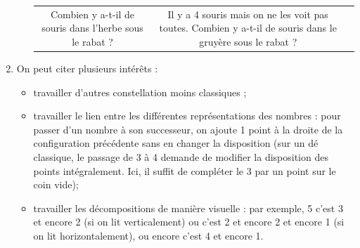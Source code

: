 \begin{corrige}
\begin{enumerate}
\begin{itemize}
\begin{tabular}{C{5}C{5}C{5}}
         Combien y a-t-il de souris dans l'herbe sous le rabat ? 
         &
         Il y a 4 souris mais on ne les voit pas toutes. \newline
         Combien y a-t-il de souris dans le gruyère sous le rabat ? \\
      \end{tabular}      
   \end{itemize}
   \bigskip
   \item On peut citer plusieurs intérêts :
   \begin{itemize}
      \item travailler d'autres constellation moins classiques ;
      \item travailler le lien entre les différentes représentations des nombres : pour passer d'un nombre à son successeur, on ajoute 1 point à la droite de la configuration précédente sans en changer la disposition (sur un dé classique, le passage de 3 à 4 demande de modifier la disposition des points intégralement. Ici, il suffit de compléter le 3 par un point sur le coin vide);
      \item travailler les décompositions de manière visuelle : par exemple, 5 c'est 3 et encore 2 (si on lit verticalement) ou c'est 2 et encore 2 et encore 1 (si on lit horizontalement), ou encore c'est 4 et encore 1.
   \end{itemize}
\end{enumerate}
\end{corrige}


\Recreation


